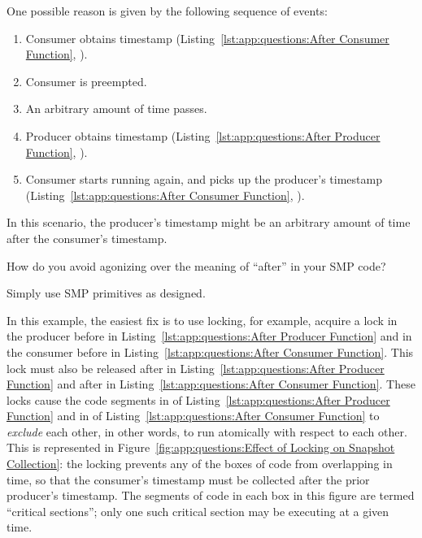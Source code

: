 \begin{lineref}
One possible reason is given by the following sequence of events:
\begin{enumerate}
\item	Consumer obtains timestamp
	(Listing~\ref{lst:app:questions:After Consumer Function},
	).
\item	Consumer is preempted.
\item	An arbitrary amount of time passes.
\item	Producer obtains timestamp
	(Listing~\ref{lst:app:questions:After Producer Function},
	).
\item	Consumer starts running again, and picks up the producer's
	timestamp
	(Listing~\ref{lst:app:questions:After Consumer Function},
	).
\end{enumerate}

In this scenario, the producer's timestamp might be an arbitrary
amount of time after the consumer's timestamp.

How do you avoid agonizing over the meaning of ``after'' in your
SMP code?

Simply use SMP primitives as designed.

In this example, the easiest fix is to use locking, for example,
acquire a lock in the producer before  in
Listing~\ref{lst:app:questions:After Producer Function} and in
the consumer before  in
Listing~\ref{lst:app:questions:After Consumer Function}.
This lock must also be released after  in
Listing~\ref{lst:app:questions:After Producer Function} and
after  in
Listing~\ref{lst:app:questions:After Consumer Function}.
These locks cause the code segments in
 of
Listing~\ref{lst:app:questions:After Producer Function} and in
 of
Listing~\ref{lst:app:questions:After Consumer Function} to {\em exclude}
each other, in other words, to run atomically with respect to each other.
This is represented in
Figure~\ref{fig:app:questions:Effect of Locking on Snapshot Collection}:
the locking prevents any of the boxes of code from overlapping in time, so
that the consumer's timestamp must be collected after the prior
producer's timestamp.
The segments of code in each box in this figure are termed
``critical sections''; only one such critical section may be executing
at a given time.
\end{lineref}

